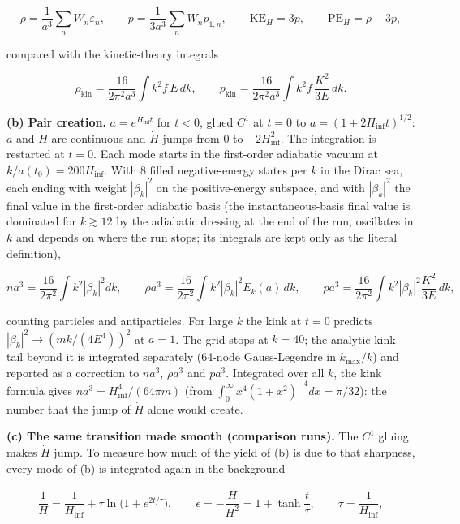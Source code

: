 \documentclass[11pt]{article}
\begin{document}
\[
\rho=\frac{1}{a^3}\sum_nW_n\varepsilon_n,\qquad p=\frac{1}{3a^3}\sum_nW_np_{1,n},\qquad \mathrm{KE}_H=3p,\qquad \mathrm{PE}_H=\rho-3p,
\]

compared with the kinetic-theory integrals

\[
\rho_{\mathrm{kin}}=\frac{16}{2\pi^2a^3}\int k^2f\,E\,dk,\qquad p_{\mathrm{kin}}=\frac{16}{2\pi^2a^3}\int k^2f\,\frac{K^2}{3E}\,dk .
\]

\textbf{(b) Pair creation.} $a=e^{H_{\mathrm{inf}}t}$ for $t<0$, glued $C^1$ at $t=0$ to $a=(1+2H_{\mathrm{inf}}t)^{1/2}$: $a$ and $H$ are continuous and $\dot H$ jumps from 0 to $-2H_{\mathrm{inf}}^2$. The integration is restarted at $t=0$. Each mode starts in the first-order adiabatic vacuum at $k/a(t_0)=200H_{\mathrm{inf}}$. With 8 filled negative-energy states per $k$ in the Dirac sea, each ending with weight $|\beta_k|^2$ on the positive-energy subspace, and with $|\beta_k|^2$ the final value in the first-order adiabatic basis (the instantaneous-basis final value is dominated for $k\gtrsim12$ by the adiabatic dressing at the end of the run, oscillates in $k$ and depends on where the run stops; its integrals are kept only as the literal definition),

\[
na^3=\frac{16}{2\pi^2}\int k^2|\beta_k|^2dk,\qquad \rho a^3=\frac{16}{2\pi^2}\int k^2|\beta_k|^2E_k(a)\,dk,\qquad pa^3=\frac{16}{2\pi^2}\int k^2|\beta_k|^2\frac{K^2}{3E}\,dk,
\]

counting particles and antiparticles. For large $k$ the kink at $t=0$ predicts $|\beta_k|^2\to(mk/(4E^4))^2$ at $a=1$. The grid stops at $k=40$; the analytic kink tail beyond it is integrated separately (64-node Gauss-Legendre in $k_{\max}/k$) and reported as a correction to $na^3$, $\rho a^3$ and $pa^3$. Integrated over all $k$, the kink formula gives $na^3=H_{\mathrm{inf}}^4/(64\pi m)$ (from $\int_0^\infty x^4(1+x^2)^{-4}dx=\pi/32$): the number that the jump of $\dot H$ alone would create.

\textbf{(c) The same transition made smooth (comparison runs).} The $C^1$ gluing makes $\dot H$ jump. To measure how much of the yield of (b) is due to that sharpness, every mode of (b) is integrated again in the background

\[
\frac{1}{H}=\frac{1}{H_{\mathrm{inf}}}+\tau\ln\bigl(1+e^{2t/\tau}\bigr),\qquad \epsilon=-\frac{\dot H}{H^2}=1+\tanh\frac t\tau,\qquad \tau=\frac{1}{H_{\mathrm{inf}}},
\]
\end{document}
